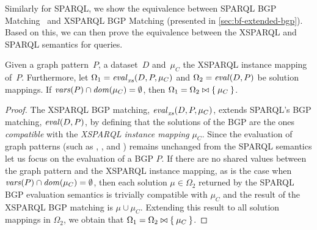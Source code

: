 Similarly for SPARQL, we show the equivalence between SPARQL \ac{BGP} Matching~\cite[Section
12.3.1]{PrudhommeauxSeaborne:2008aa} and XSPARQL \ac{BGP} Matching (presented in \cref{sec:bf-extended-bgp}).
%
Based on this, we can then prove the equivalence between the XSPARQL and SPARQL semantics for \CONSTRUCT queries.
%
\begin{lemma}
  \label{lemma:xsparql-instance-mapping}
  Given a graph pattern~$P$, a dataset~$D$ and~$\mu_C$ the XSPARQL instance mapping of~$P$. Furthermore, let $\Omega_1 =
  \mathit{{\mathit{eval}}_{\mathit{xs}}^{\mathit{}}}\!\left(D, P, \mu_C\right)$ and $\Omega_2 = \mathit{eval}\!\left(D, P\right)$ be solution mappings.  If $\mathit{vars}\!\left(P\right) \cap \mathit{dom}\!\left(\mu_C\right) = \emptyset$,
  then $\Omega_1 = \Omega_2 \bowtie \left\{\:\mu_C\:\right\}$.
\end{lemma}
%
\begin{proof}
  The XSPARQL BGP matching, $\mathit{{\mathit{eval}}_{\mathit{xs}}^{\mathit{}}}\!\left(D, P, \mu_C\right)$, extends SPARQL's BGP matching, $\mathit{eval}\!\left(D, P\right)$, by defining that the
  solutions of the BGP are the ones \emph{compatible} with the \emph{XSPARQL instance mapping} $\mu_C$.
  Since the evaluation of graph patterns (such as \UNION, \OPTIONAL, \GRAPH and \FILTER) remains unchanged from the
  SPARQL semantics let us focus on the evaluation of a BGP $P$. 
  If there are no shared values between the graph pattern and the XSPARQL instance mapping, as is the case
  when~$\mathit{vars}\!\left(P\right) \cap \mathit{dom}\!\left(\mu_C\right) = \emptyset$, then each solution $\mu \in \Omega_2$ returned by the SPARQL BGP
  evaluation semantics is trivially compatible with $\mu_C$ and the result of the XSPARQL BGP matching is $\mu \cup
  \mu_C$.  Extending this result to all solution mappings in $\Omega_2$, we obtain that $\Omega_1 = \Omega_2 \bowtie
  \left\{\:\mu_C\:\right\}$.
\end{proof}


